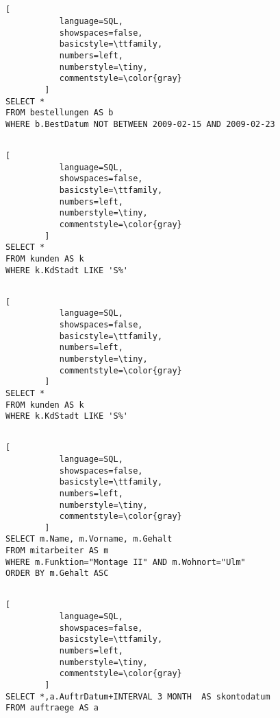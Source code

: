 \documentclass{article}
\begin{document}
\hfill \break
\subsection{}
\begin{lstlisting}[
           language=SQL,
           showspaces=false,
           basicstyle=\ttfamily,
           numbers=left,
           numberstyle=\tiny,
           commentstyle=\color{gray}
        ]
SELECT *
FROM bestellungen AS b
WHERE b.BestDatum NOT BETWEEN 2009-02-15 AND 2009-02-23
\end{lstlisting}

\hfill \break
\subsection{}
\begin{lstlisting}[
           language=SQL,
           showspaces=false,
           basicstyle=\ttfamily,
           numbers=left,
           numberstyle=\tiny,
           commentstyle=\color{gray}
        ]
SELECT *
FROM kunden AS k
WHERE k.KdStadt LIKE 'S%'
\end{lstlisting}

\hfill \break
\subsection{}
\begin{lstlisting}[
           language=SQL,
           showspaces=false,
           basicstyle=\ttfamily,
           numbers=left,
           numberstyle=\tiny,
           commentstyle=\color{gray}
        ]
SELECT *
FROM kunden AS k
WHERE k.KdStadt LIKE 'S%'
\end{lstlisting}


\hfill \break
\subsection{}
\begin{lstlisting}[
           language=SQL,
           showspaces=false,
           basicstyle=\ttfamily,
           numbers=left,
           numberstyle=\tiny,
           commentstyle=\color{gray}
        ]
SELECT m.Name, m.Vorname, m.Gehalt
FROM mitarbeiter AS m
WHERE m.Funktion="Montage II" AND m.Wohnort="Ulm"
ORDER BY m.Gehalt ASC
\end{lstlisting}

\hfill \break
\subsection{}
\begin{lstlisting}[
           language=SQL,
           showspaces=false,
           basicstyle=\ttfamily,
           numbers=left,
           numberstyle=\tiny,
           commentstyle=\color{gray}
        ]
SELECT *,a.AuftrDatum+INTERVAL 3 MONTH  AS skontodatum
FROM auftraege AS a
\end{lstlisting}
\end{document}
